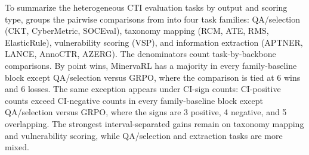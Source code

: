 \begin{table}[t]
\centering
\scriptsize
\caption{Llama-3.1-8B component ablations on validation splits and the 12 CTI evaluation tasks. Validation columns report Minerva-Dev and AthenaBench-Mini scores. Evaluation columns report the 12-task macro average and paired bootstrap interval sign counts across the 12 tasks. Underlined values indicate the best score in each validation or 12-task average column.}
\label{tab:eval12-ablation-summary}
\setlength{\tabcolsep}{3pt}
\renewcommand{\arraystretch}{0.95}
\end{table}

To summarize the heterogeneous CTI evaluation tasks by output and scoring type,  groups the pairwise comparisons from  into four task families: QA/selection (CKT, CyberMetric, SOCEval), taxonomy mapping (RCM, ATE, RMS, ElasticRule), vulnerability scoring (VSP), and information extraction (APTNER, LANCE, AnnoCTR, AZERG). The denominators count task-by-backbone comparisons. By point wins, MinervaRL has a majority in every family-baseline block except QA/selection versus GRPO, where the comparison is tied at 6 wins and 6 losses. The same exception appears under CI-sign counts: CI-positive counts exceed CI-negative counts in every family-baseline block except QA/selection versus GRPO, where the signs are 3 positive, 4 negative, and 5 overlapping. The strongest interval-separated gains remain on taxonomy mapping and vulnerability scoring, while QA/selection and extraction tasks are more mixed.

